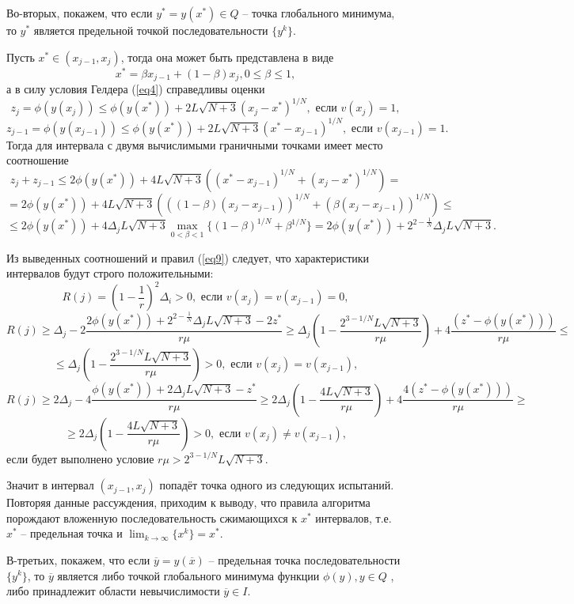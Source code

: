 \documentclass[10pt,a4paper]{book}
\begin{document}
Во-вторых, покажем, что если $y^* = y(x^*) \in Q$ -- точка глобального минимума, то $y^*$ является предельной точкой последовательности $\{y^k\}$.

Пусть $x^* \in (x_{j-1}, x_{j})$, тогда она может быть представлена в виде
\[
x^* = \beta x_{j-1}+(1-\beta)x_j, 0 \leq \beta \leq 1,
\]
а в силу условия Гелдера (\ref{eq4}) справедливы оценки
\[
z_j=\phi(y(x_j)) \leq \phi(y(x^*)) + 2L\sqrt{N+3}(x_j - x^*)^{1/N}, \text{ если } v(x_j) = 1,
\]
\[
z_{j-1}=\phi(y(x_{j-1})) \leq \phi(y(x^*)) + 2L\sqrt{N+3}(x^* - x_{j-1})^{1/N},\text{ если } v(x_{j - 1}) = 1.
\]
Тогда для интервала с двумя вычислимыми граничными точками имеет место соотношение
\[
z_j+z_{j-1} \leq 2\phi(y(x^*)) + 4L\sqrt{N+3}((x^* - x_{j-1})^{1/N}+(x_j-x^*)^{1/N}) =
\]
\[
= 2\phi(y(x^*)) + 4L\sqrt{N+3}(((1-\beta)(x_j-x_{j-1}))^{1/N}+(\beta (x_j-x_{j-1}))^{1/N}) \leq
\]
\[
\leq 2\phi(y(x^*)) + 4\Delta_j L\sqrt{N+3}\max_{0< \beta < 1}{\{(1-\beta)^{1/N}+\beta^{1/N}\}} = 2\phi(y(x^*)) + 2^{2-\frac{1}{N}}\Delta_j L\sqrt{N+3}.
\]

Из выведенных соотношений и правил (\ref{eq9}) следует, что характеристики интервалов будут строго положительными:
\[
R(j) =(1-\frac{1}{r})^2\Delta_i>0, \text{ если } v(x_j) = v(x_{j-1}) = 0,
\]
\[
R(j) \geq \Delta_j-2\frac{2\phi(y(x^*)) + 2^{2-\frac{1}{N}}\Delta_j L\sqrt{N+3}-2z^*}{r\mu} \geq \Delta_j(1-\frac{2^{3-1/N}L\sqrt{N+3}}{r\mu}) + 4\frac{(z^*-\phi(y(x^*)))}{r\mu} \leq
\]
\[
\leq \Delta_j(1-\frac{2^{3-1/N}L\sqrt{N+3}}{r\mu})>0, \text{ если } v(x_j) = v(x_{j-1}),
\]
\[
R(j) \geq 2\Delta_j-4\frac{\phi(y(x^*))+2\Delta_jL\sqrt{N+3}-z^*}{r\mu} \geq 2\Delta_j(1-\frac{4L\sqrt{N+3}}{r\mu}) + 4\frac{4(z^*-\phi(y(x^*)))}{r\mu}\geq
\]
\[
\geq 2\Delta_j(1-\frac{4L\sqrt{N+3}}{r\mu})>0,\text{ если } v(x_j) \neq v(x_{j-1}),
\]
если будет выполнено условие $r\mu > 2^{3-1/N}L\sqrt{N+3}$.

Значит в интервал $(x_{j-1}, x_{j})$ попадёт точка одного из следующих испытаний. Повторяя данные рассуждения, приходим к выводу, что правила алгоритма порождают вложенную последовательность сжимающихся к $x^*$ интервалов, т.е. $x^*$ -- предельная точка и $\lim_{k \to \infty}{\{x^k\}} = x^*$.

В-третьих, покажем, что если $\overline{y} = y(\overline{x})$ -- предельная точка последовательности $\{y^k\}$, то $\overline{y}$ является либо точкой глобального минимума функции $\phi(y), y \in Q$ , либо принадлежит области невычислимости $\overline{y} \in I$.
\end{document}
